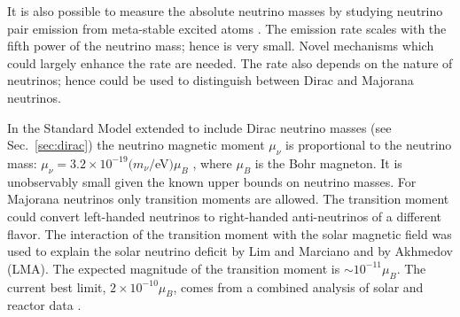 It is also possible to measure the absolute neutrino masses by
studying neutrino pair emission from meta-stable excited atoms
\cite{Yos07}. The emission rate scales with the fifth power of the
neutrino mass; hence is very small. Novel mechanisms which could
largely enhance the rate are needed. The rate also depends on the
nature of neutrinos; hence could be used to distinguish between Dirac
and Majorana neutrinos.

In the Standard Model extended to include Dirac neutrino masses (see
Sec.~\ref{sec:dirac}) the neutrino magnetic moment $\mu_{\nu}$ is
proportional to the neutrino mass: $\mu_{\nu} = 3.2 \times
10^{-19}(m_{\nu}/$eV$)\mu_{B}$ \cite{Fuj80}, where $\mu_{B}$ is the
Bohr magneton. It is unobservably small given the known upper bounds
on neutrino masses. For Majorana neutrinos only transition moments are
allowed. The transition moment could convert left-handed neutrinos to
right-handed anti-neutrinos of a different flavor. The interaction of
the transition moment with the solar magnetic field was used to
explain the solar neutrino deficit by Lim and Marciano \cite{Lim88}
and by Akhmedov \cite{Akh88} (LMA). The expected magnitude of the
transition moment is $\sim 10^{-11}\mu_{B}$. The current best limit,
$2 \times 10^{-10}\mu_{B}$, comes from a combined analysis of solar
and reactor data \cite{Gri02}.

